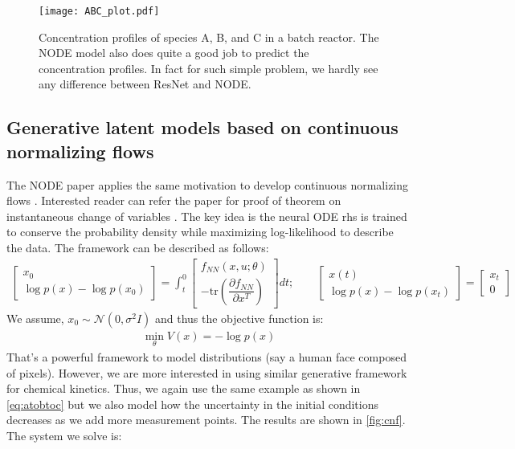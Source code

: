\documentclass[fontsize=11pt]{article}
\theoremstyle{definition}
\begin{document}
\begin{figure}[h]
    \centering
    \texttt{[image: ABC\_plot.pdf]} 
    \caption{Concentration profiles of species A, B, and C in a batch reactor. The
    NODE model also does quite a good job to predict the concentration profiles. 
    In fact for such simple problem, we hardly see any difference between ResNet and NODE.}
    \label{fig:node}
\end{figure}

\subsection{Generative latent models based on continuous normalizing flows}

The NODE paper applies the same motivation to develop continuous normalizing flows
\citep{grathwohl:chen:bettencourt:sutskever:duvenaud:2018}.
Interested reader can refer the paper for proof of theorem on instantaneous change of variables
\citep{chen:rubanova:bettencourt:duvenaud:2018}.
The key idea is the neural ODE rhs is trained to conserve the probability density 
while maximizing log-likelihood to describe the data. The framework can be described 
as follows:
\begin{align}
    \begin{bmatrix}
        x_0 \\
        \log p(x) - \log p(x_0)
    \end{bmatrix}
    =
    \int_{t}^{0}
    \begin{bmatrix}
        f_{NN}(x, u; \theta) \\
        -\mathrm{tr} \left(\dfrac{\partial f_{NN}}{\partial x^T}\right)
    \end{bmatrix} dt;
    \qquad
    \begin{bmatrix}
        x(t) \\
        \log p(x) - \log p(x_t)
    \end{bmatrix}   
    =
    \begin{bmatrix}
        x_t \\
        0
    \end{bmatrix}
\end{align}
We assume, $x_0 \sim \mathcal{N}(0, \sigma^2I)$ and thus the objective function is:
\begin{align}
    \min\limits_{\theta} V(x) = -\log p(x)
\end{align}
That's a powerful framework to model distributions (say a human face composed of pixels).
However, we are more interested in using similar generative framework for chemical kinetics. 
Thus, we again use the same example as shown in \cref{eq:atobtoc} but we also model 
how the uncertainty in the initial conditions decreases as we add more measurement points.
The results are shown in \cref{fig:cnf}. The system we solve is:
\end{document}
